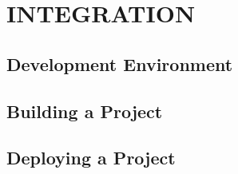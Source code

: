 \section{ INTEGRATION }

\subsection{ Development Environment }
\subsection{ Building a Project }
\subsection{ Deploying a Project }
